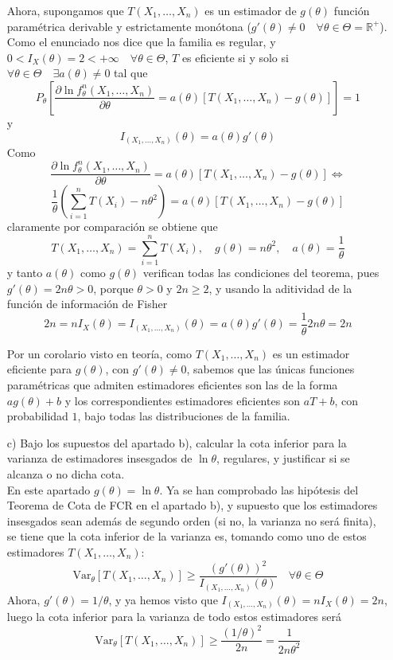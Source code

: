 \documentclass[12pt]{article}
\newcommand{\V}{\mathrm{Var}}
\newcommand{\R}{\mathbb{R}}
\newcommand{\Rmas}{\R^{+}}
\begin{document}
\begin{ejercicio}[2 puntos]
\begin{enumerate}
            Ahora, supongamos que $T(X_1, \ldots, X_n)$ es un estimador de $g(\theta)$ función paramétrica derivable y estrictamente monótona
            ($g'(\theta) \neq 0 \quad \forall \theta \in \Theta = \Rmas$). Como el enunciado nos dice que la familia es regular, y 
            $0 < I_X(\theta) = 2 < +\infty \quad \forall \theta \in \Theta$, $T$ es eficiente si y solo si $\forall \theta \in \Theta
            \quad \exists a(\theta) \neq 0$ tal que 
            $$P_\theta \left[ \dfrac{\partial \ln f_\theta^n(X_1, \ldots, X_n)}{\partial \theta} = a(\theta)[T(X_1, \ldots, X_n) - g(\theta)]\right] = 1$$
            y
            $$I_{(X_1, \ldots, X_n)}(\theta) = a(\theta) g'(\theta)$$
            Como 
            $$\dfrac{\partial \ln f_\theta^n(X_1, \ldots, X_n)}{\partial \theta} = a(\theta)[T(X_1, \ldots, X_n) - g(\theta)] \iff$$
            $$\dfrac{1}{\theta} \left( \sum_{i=1}^{n} T(X_i) - n \theta^2 \right) = a(\theta) [T(X_1, \ldots, X_n) - g(\theta)]$$
            claramente por comparación se obtiene que 
            $$T(X_1, \ldots, X_n) = \sum_{i=1}^{n} T(X_i), \quad g(\theta) = n \theta^2, \quad a(\theta) = \dfrac{1}{\theta}$$
            y tanto $a(\theta)$ como $g(\theta)$ verifican todas las condiciones del teorema, pues $g'(\theta) = 2n \theta > 0$, porque $\theta > 0$
            y $2n \geqslant 2$, y usando la aditividad de la función de información de Fisher
            $$2n = n I_X(\theta) = I_{(X_1, \ldots, X_n)}(\theta) = a(\theta) g'(\theta) = \dfrac{1}{\theta} 2 n \theta = 2n$$

            Por un corolario visto en teoría, como $T(X_1, \ldots, X_n)$ es un estimador eficiente para $g(\theta)$, con $g'(\theta) \neq 0$,
            sabemos que las únicas funciones paramétricas que admiten estimadores eficientes son las de la forma $a g(\theta) + b$ y los correspondientes
            estimadores eficientes son $aT + b$, con probabilidad $1$, bajo todas las distribuciones de la familia.

            \item[c)] Bajo los supuestos del apartado b), calcular la cota inferior para la varianza
            de estimadores insesgados de $\ln\theta$, regulares, y justificar si se alcanza o no dicha cota. \\

            En este apartado $g(\theta) = \ln \theta$. Ya se han comprobado las hipótesis del Teorema de Cota de FCR en el apartado b), y 
            supuesto que los estimadores insesgados sean además de segundo orden (si no, la varianza no será finita), se tiene que
            la cota inferior de la varianza es, tomando como uno de estos estimadores $T(X_1, \ldots, X_n)$:
            $$\V_\theta[T(X_1, \ldots, X_n)] \geqslant \dfrac{(g'(\theta))^2}{I_{(X_1, \ldots, X_n)}(\theta)} \quad \forall \theta \in \Theta$$
            Ahora, $g'(\theta) = 1 / \theta$, y ya hemos visto que $I_{(X_1, \ldots, X_n)}(\theta) = n I_X(\theta) = 2n$, luego la cota inferior
            para la varianza de todo estos estimadores será
            $$\V_\theta[T(X_1, \ldots, X_n)] \geqslant \dfrac{(1/\theta)^2}{2n} = \dfrac{1}{2n \theta^2}$$ 


\end{enumerate}
\end{ejercicio}
\end{document}
